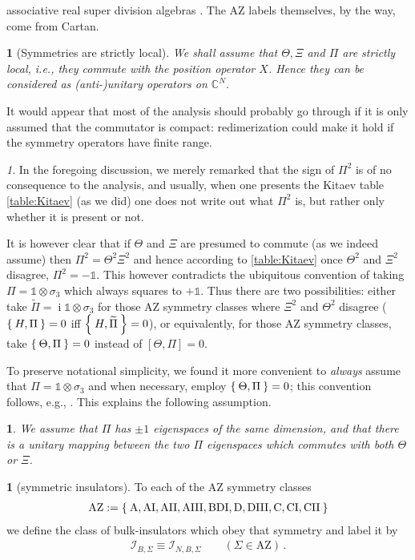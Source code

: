 \documentclass[a4paper,10pt]{article}
\numberwithin{equation}{section}
\theoremstyle{plain}
\theoremstyle{plain}
\theoremstyle{plain}
\theoremstyle{plain}
\theoremstyle{plain}
\newtheorem{assumption}[thm]{\protect\assumptionname}
\theoremstyle{remark}
\newtheorem{rem}[thm]{\protect\remarkname}
\theoremstyle{definition}
\newtheorem{defn}[thm]{\protect\definitionname}
\theoremstyle{plain}
\providecommand{\assumptionname}{Assumption}
\providecommand{\definitionname}{Definition}
\providecommand{\remarkname}{Remark}
\newcommand{\ii}{\operatorname{i}}
\newcommand{\CC}{\mathbb{C}}
\newcommand{\calI}{\mathcal{I}}
\newcommand{\Id}{\mathds{1}}
\newcommand{\eq}[1]{\begin{align*}#1\end{align*}}
\begin{document}
associative real super division algebras \cite{Wall1964,Deligne1999}. The AZ labels themselves, by the way, come from Cartan.
	
	
	
	\begin{assumption}[Symmetries are strictly local] We shall assume that $\Theta,\Xi$ and $\Pi$ are strictly local, i.e., they \emph{commute} with the position operator $X$. Hence they can be considered as (anti-)unitary operators on $\CC^N$.
	\end{assumption}
	It would appear that most of the analysis should probably go through if it is only assumed that the commutator is compact: redimerization could make it hold if the symmetry operators have finite range.
	\begin{rem}\label{rem:conventional choices for Pi}
		In the foregoing discussion, we merely remarked that the sign of $\Pi^2$ is of no consequence to the analysis, and usually, when one presents the Kitaev table \cref{table:Kitaev} (as we did) one does not write out what $\Pi^2$ is, but rather only whether it is present or not. 
		
		It is however clear that if $\Theta$ and $\Xi$ are presumed to commute (as we indeed assume) then $\Pi^2=\Theta^2 \Xi^2$ and hence according to \cref{table:Kitaev} once $\Theta^2$ and $\Xi^2$ disagree, $\Pi^2=-\Id$. This however contradicts the ubiquitous convention of taking $\Pi=\Id\otimes\sigma_3$ which always squares to $+\Id$. Thus there are two possibilities: either take $\widetilde{\Pi}=\ii \Id\otimes\sigma_3$ for those AZ symmetry classes where $\Xi^2$ and $\Theta^2$ disagree ($\Set{H,\Pi}=0$ iff $\Set{H,\widetilde{\Pi}}=0$), or equivalently, for those AZ symmetry classes, take $\Set{\Theta,\Pi}=0$ instead of $[\Theta,\Pi]=0$.
		
		To preserve notational simplicity, we found it more convenient to \emph{always} assume that $\Pi=\Id\otimes\sigma_3$ and when necessary, employ $\Set{\Theta,\Pi}=0$; this convention follows, e.g., \cite{KatsuraKoma2018}. This explains the following assumption.
	\end{rem}
	
	
	\begin{assumption}\label{ass:chirality has same dimensions for its eigenspaces}
		We assume that $\Pi$ has $\pm1$ eigenspaces of the same dimension, and that there is a unitary mapping between the two $\Pi$ eigenspaces which commutes with both $\Theta$ or $\Xi$.
	\end{assumption}
	\begin{defn}[symmetric insulators] To each of the AZ symmetry classes \eq{\mathrm{AZ}:=\Set{\mathrm{A},\mathrm{AI},\mathrm{AII},\mathrm{AIII},\mathrm{BDI},\mathrm{D},\mathrm{DIII},\mathrm{C},\mathrm{CI},\mathrm{CII}}} we define the class of bulk-insulators which obey that symmetry and label it by \eq{\calI_{B,\Sigma}\equiv\calI_{N,B,\Sigma}\qquad(\Sigma\in\mathrm{AZ})\,.}
	\end{defn}
	
\end{document}
